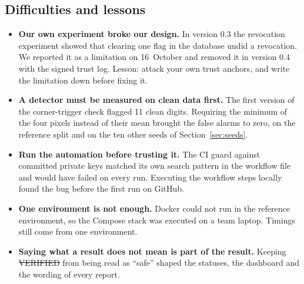 \subsection{Difficulties and lessons}
\begin{itemize}
\item \textbf{Our own experiment broke our design.} In version 0.3 the revocation experiment showed that
  clearing one flag in the database undid a revocation. We reported it as a limitation on 16~October and
  removed it in version 0.4 with the signed trust log. Lesson: attack your own trust anchors, and write the
  limitation down before fixing it.
\item \textbf{A detector must be measured on clean data first.} The first version of the corner-trigger check
  flagged 11 clean digits. Requiring the minimum of the four pixels instead of their mean brought the false
  alarms to zero, on the reference split and on the ten other seeds of Section~\ref{sec:seeds}.
\item \textbf{Run the automation before trusting it.} The CI guard against committed private keys matched
  its own search pattern in the workflow file and would have failed on every run. Executing the workflow steps
  locally found the bug before the first run on GitHub.
\item \textbf{One environment is not enough.} Docker could not run in the reference environment, so the
  Compose stack was executed on a team laptop. Timings still come from one environment.
\item \textbf{Saying what a result does not mean is part of the result.} Keeping \st{VERIFIED} from being read
  as ``safe'' shaped the statuses, the dashboard and the wording of every report.
\end{itemize}
